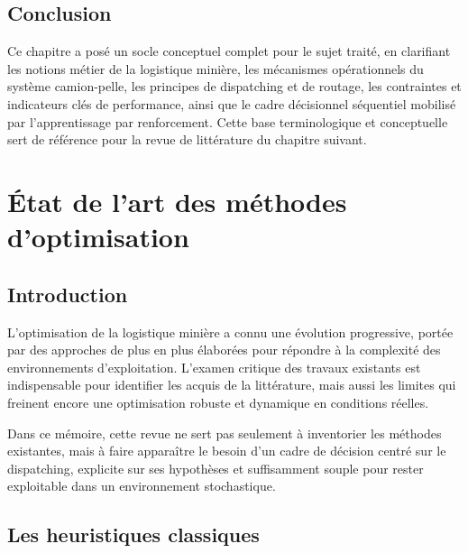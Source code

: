 \documentclass[11pt,a4paper]{report}
\begin{document}
\section{Conclusion}
\label{sec:conclusion-contexte}

Ce chapitre a posé un socle conceptuel complet pour le sujet traité, en clarifiant les notions métier de la logistique minière, les mécanismes opérationnels du système camion-pelle, les principes de dispatching et de routage, les contraintes et indicateurs clés de performance, ainsi que le cadre décisionnel séquentiel mobilisé par l'apprentissage par renforcement. Cette base terminologique et conceptuelle sert de référence pour la revue de littérature du chapitre suivant.

\chapter{État de l'art des méthodes d'optimisation} 
\label{chap:etat-art} 

\section*{Introduction}

L'optimisation de la logistique minière a connu une évolution progressive, portée par des approches de plus en plus élaborées pour répondre à la complexité des environnements d'exploitation. L'examen critique des travaux existants est indispensable pour identifier les acquis de la littérature, mais aussi les limites qui freinent encore une optimisation robuste et dynamique en conditions réelles.

Dans ce mémoire, cette revue ne sert pas seulement à inventorier les méthodes existantes, mais à faire apparaître le besoin d'un cadre de décision centré sur le dispatching, explicite sur ses hypothèses et suffisamment souple pour rester exploitable dans un environnement stochastique.


\section{Les heuristiques classiques}
\label{sec:heuristiques-industrielles}
\end{document}
